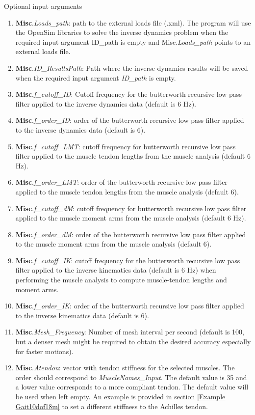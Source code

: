 \documentclass[a4paper,oneside,11pt]{article}
\begin{document}
Optional input arguments
\begin{enumerate}
	\item \textbf{Misc}.\textit{Loads_path}: path to the external loads file (.xml). The program will use the OpenSim libraries to solve the inverse dynamics problem when the required input argument ID_path is empty and Misc.\textit{Loads_path} points to an external loads file.
	\item \textbf{Misc}.\textit{ID_ResultsPath}: Path where the inverse dynamics results will be saved when the required input argument \textit{ID_path} is empty.
	\item \textbf{Misc}.\textit{f_cutoff_ID}: Cutoff frequency for the butterworth recursive low pass filter applied to the inverse dynamics data (default is 6 Hz).
	\item \textbf{Misc}.\textit{f_order_ID}: order of the butterworth recursive low pass filter applied to the inverse dynamics data (default is 6).
	
	\item \textbf{Misc}.\textit{f_cutoff_LMT}: cutoff frequency for butterworth recursive low pass filter applied to the muscle tendon lengths from the muscle analysis (default 6 Hz).
	\item \textbf{Misc}.\textit{f_order_LMT}: order of the butterworth recursive low pass filter applied to the muscle tendon lengths from the muscle analysis (default 6).		
	
	\item \textbf{Misc}.\textit{f_cutoff_dM}: cutoff frequency for butterworth recursive low pass filter applied to the muscle moment arms from the muscle analysis (default 6 Hz).
	\item \textbf{Misc}.\textit{f_order_dM}: order of the butterworth recursive low pass filter applied to the muscle moment arms from the muscle analysis (default 6).

	\item \textbf{Misc}.\textit{f_cutoff_IK}: cutoff frequency for the butterworth recursive low pass filter applied to the inverse kinematics data (default is 6 Hz) when performing the muscle analysis to compute muscle-tendon lengths and moment arms.
	\item \textbf{Misc}.\textit{f_order_IK}: order of the butterworth recursive low pass filter applied to the inverse kinematics data (default is 6).

	\item \textbf{Misc}.\textit{Mesh_Frequency}: Number of mesh interval per second (default is 100, but a denser mesh might be required to obtain the desired accuracy especially for faster motions).
	\item \textbf{Misc}.\textit{Atendon}: vector with tendon stiffness for the selected muscles. The order should correspond to \textit{MuscleNames_Input}. The default value is 35 and a lower value corresponds to a more compliant tendon. The default value will be used when left empty. An example is provided in section \ref{Example Gait10dof18m} to set a different stiffness to the Achilles tendon.

\end{enumerate}
\end{document}
